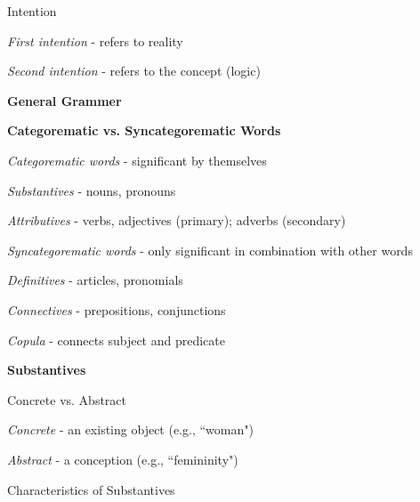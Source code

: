 \documentclass{report}
\begin{document}
\begin{outline}
\begin{outline}
\begin{outline}
\begin{outline}
      \end{outline}
      \item Intention
      \begin{outline}
        \item \textit{First intention} - refers to reality
        \item \textit{Second intention} - refers to the concept (logic)
      \end{outline}
      \newpage
    \end{outline}
  \end{outline}
  \item {\bf General Grammer}
  \begin{outline}
    \item{\bf Categorematic vs. Syncategorematic Words}
    \begin{outline}
      \item \textit{Categorematic words} - significant by themselves
      \begin{outline}
        \item \textit{Substantives} - nouns, pronouns
        \item \textit{Attributives} - verbs, adjectives (primary); adverbs (secondary)
      \end{outline}
      \item \textit{Syncategorematic words} - only significant in combination with other words
      \begin{outline}
        \item \textit{Definitives} - articles, pronomials
        \item \textit{Connectives} - prepositions, conjunctions
        \item \textit{Copula} - connects subject and predicate
      \end{outline}
    \end{outline}
    \item {\bf Substantives}
      \begin{outline}
      \item Concrete vs. Abstract
        \begin{outline}
          \item \textit{Concrete} - an existing object (e.g., ``woman")
          \item \textit{Abstract} - a conception (e.g., ``femininity")
        \end{outline}
      \item Characteristics of Substantives
      \begin{outline}

\end{outline}
\end{outline}
\end{outline}
\end{outline}
\end{document}
